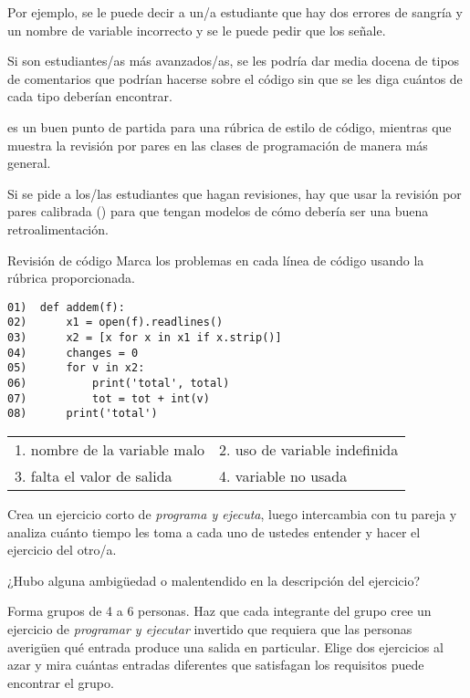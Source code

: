 Por ejemplo, 
se le puede decir a un/a estudiante que hay dos errores de sangría y un nombre de variable incorrecto y se le puede pedir que los señale.

Si son estudiantes/as más avanzados/as, se les podría dar media docena de tipos de comentarios que podrían hacerse sobre el código sin que se les diga cuántos de cada tipo deberían encontrar.

\cite{Steg2016b} es un buen punto de partida para una rúbrica de estilo de código, mientras que~\cite{Luxt2009} muestra la revisión por pares en las clases de programación de manera más general.

Si se pide a los/las estudiantes que hagan revisiones, hay que usar la revisión por pares calibrada () para que tengan modelos de cómo debería ser una buena retroalimentación.

\begin{aside}{Revisión de código}
 Marca los problemas en cada línea de código usando la rúbrica proporcionada.

\begin{verbatim}
01)  def addem(f):
02)      x1 = open(f).readlines()
03)      x2 = [x for x in x1 if x.strip()]
04)      changes = 0
05)      for v in x2:
06)          print('total', total)
07)          tot = tot + int(v)
08)      print('total')
\end{verbatim}

   \begin{longtable}{ll}
    1. nombre de la variable malo   & 2. uso de variable indefinida \\
    3. falta el valor de salida & 4. variable no usada
  \end{longtable}

\end{aside}



Crea un ejercicio corto de \emph{programa y ejecuta}, 
luego intercambia con tu pareja 
y analiza cuánto tiempo les toma a cada uno de ustedes entender y hacer el ejercicio del otro/a.

¿Hubo alguna ambigüedad o malentendido en la descripción del ejercicio?


Forma grupos de 4 a 6 personas.
Haz que cada integrante del grupo cree un ejercicio de \emph{programar y ejecutar} invertido que requiera que las personas averigüen qué entrada produce una salida en particular.
Elige dos ejercicios al azar 
y mira cuántas entradas diferentes que satisfagan los requisitos puede encontrar el grupo.

